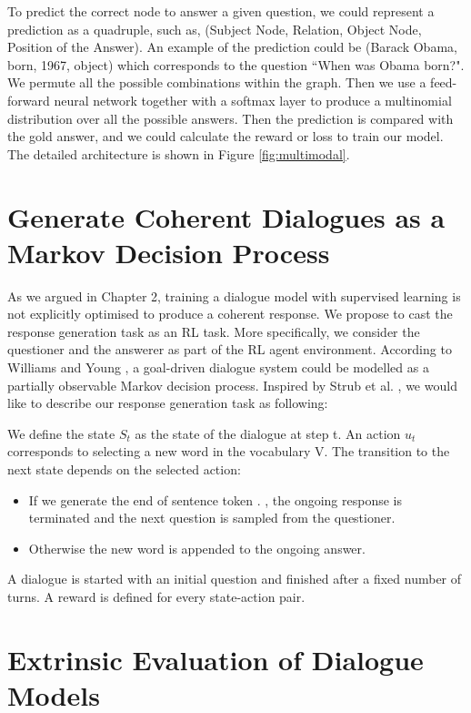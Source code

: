 \documentclass[bsc,frontabs,twoside,singlespacing,parskip,deptreport]{infthesis}     %
\begin{document}
To predict the correct node to answer a given question, we could represent a prediction as a quadruple, such as, (Subject Node, Relation, Object Node, Position of the Answer). An example of the prediction could be (Barack Obama, born, 1967, object) which corresponds to the question ``When was Obama born?". We permute all the possible combinations within the graph. Then we use a feed-forward neural network together with a softmax layer to produce a multinomial distribution over all the possible answers. Then the prediction is compared with the gold answer, and we could calculate the reward or loss to train our model. The detailed architecture is shown in Figure \ref{fig:multimodal}.

\section{Generate Coherent Dialogues as a Markov Decision Process}

As we argued in Chapter 2, training a dialogue model with supervised learning is not explicitly optimised to produce a coherent response. We propose to cast the response generation task as an RL task. More specifically, we consider the questioner and the answerer as part of the RL agent environment. According to Williams and Young \cite{williams2007partially}, a goal-driven dialogue system could be modelled as a partially observable Markov decision process. Inspired by Strub et al. \cite{strub2017end}, we would like to describe our response generation task as following:

We define the state $S_t$ as the state of the dialogue at step t. An action $u_t$ corresponds to selecting a new word in the vocabulary V. The transition to the next state depends on the selected action:

\begin{itemize}
\item If we generate the end of sentence token . , the ongoing response is terminated and the next question is sampled from the questioner.
\item Otherwise the new word is appended to the ongoing answer.
\end{itemize}

A dialogue is started with an initial question and finished after a fixed number of turns. A reward is defined for every state-action pair. 

\section{Extrinsic Evaluation of Dialogue Models}
\end{document}
